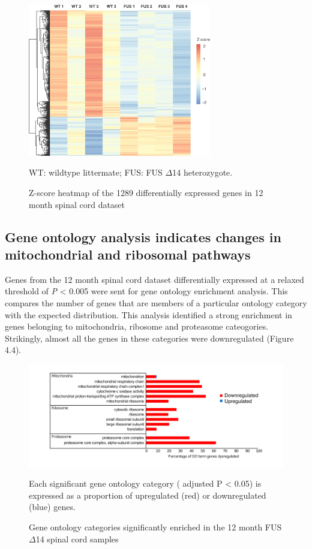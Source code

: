 \begin{figure}[h!]
	\begin{center}
		\includegraphics[width=8cm]{Figures/04_fus_mice/anny_normalised_heatmap.png}
	\end{center}
	\caption{Z-score heatmap of the 1289 differentially expressed genes in 12 month spinal cord dataset}
	WT: wildtype littermate; FUS: FUS $\Delta$14 heterozygote. 
\end{figure}


\subsection{Gene ontology analysis indicates changes in mitochondrial and ribosomal pathways}
Genes from the 12 month spinal cord dataset differentially expressed at a relaxed threshold of \textit{P} < 0.005 were sent for gene ontology enrichment analysis. This compares the number of genes that are members of a particular ontology category with the expected distribution. This analysis identified a strong enrichment in genes belonging to mitochondria, ribosome and proteasome cateogories. Strikingly, almost all the genes in these categories were downregulated (Figure 4.4).
\begin{figure}[h!]
	\begin{center}
		\includegraphics[width=12cm]{Figures/04_fus_mice/anny_GO_terms.png}
	\end{center}
	\caption{Gene ontology categories significantly enriched in the 12 month FUS $\Delta$14 spinal cord samples  }
		Each significant gene ontology category ( adjusted P < 0.05) is expressed as a proportion of upregulated (red) or downregulated (blue) genes.
\end{figure}

